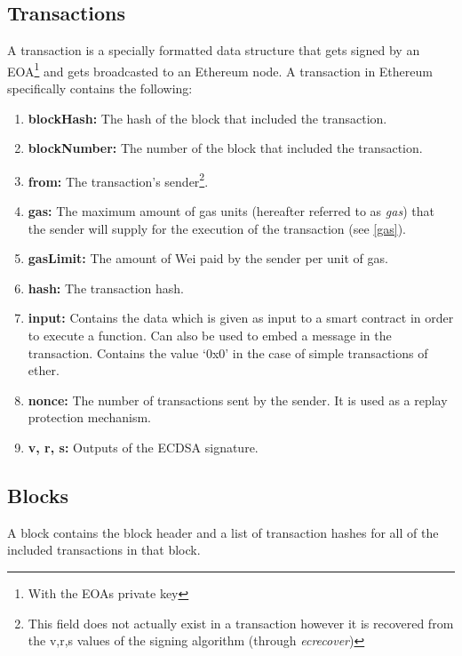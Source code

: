 \subsection{Transactions} \label{transactions}
A transaction is a specially formatted data structure that gets signed by an EOA\footnote{With the EOAs private key} and gets broadcasted to an Ethereum node. A transaction in Ethereum specifically contains the following:
\begin{enumerate}
    \item \textbf{blockHash:} The hash of the block that included the transaction.
    \item \textbf{blockNumber:} The number of the block that included the transaction.
    \item \textbf{from:} The transaction's sender\footnote{This field does not actually exist in a transaction however it is recovered from the v,r,s values of the signing algorithm (through \textit{ecrecover})}.
    \item \textbf{gas:} The maximum amount of gas units (hereafter referred to as \textit{gas}) that the sender will supply for the execution of the transaction (see \ref{gas}).
    \item \textbf{gasLimit:} The amount of Wei paid by the sender per unit of gas.
    \item \textbf{hash:} The transaction hash.
    \item \textbf{input:} Contains the data which is given as input to a smart contract in order to execute a function. Can also be used to embed a message in the transaction. Contains the value `0x0' in the case of simple transactions of ether.
    \item \textbf{nonce:} The number of transactions sent by the sender. It is used as a replay protection mechanism.
    \item \textbf{v, r, s:} Outputs of the ECDSA signature.
\end{enumerate}

\subsection{Blocks} \label{block}
A block contains the block header and a list of transaction hashes for all of the included transactions in that block. 

